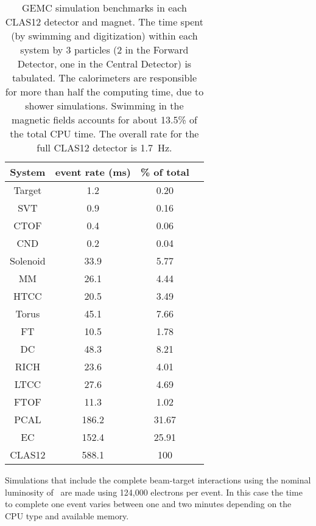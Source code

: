 \begin{table}[h]
	\begin{center}
		\begin{tabular}{ |c | c | c | c |} \hline \hline
System	 & event rate (ms)   &  \% of total\\
			\hline
Target   &  1.2   & 0.20  \\
SVT      &  0.9   & 0.16  \\
CTOF     &  0.4   & 0.06  \\
CND      &  0.2   & 0.04  \\
Solenoid &  33.9  & 5.77  \\
MM       &  26.1  & 4.44  \\
HTCC     &  20.5  & 3.49  \\
Torus    &  45.1  & 7.66  \\
FT       &  10.5  & 1.78  \\
DC       &  48.3  & 8.21  \\
RICH     &  23.6  & 4.01  \\
LTCC     &  27.6  & 4.69  \\
FTOF     &  11.3  & 1.02  \\
PCAL     &  186.2 & 31.67 \\
EC       &  152.4 & 25.91 \\ \hline
CLAS12   &  588.1 & 100 \\ \hline \hline
	\end{tabular}
	\end{center}
	\caption{GEMC simulation benchmarks in each CLAS12 detector and magnet. The time spent (by swimming and
          digitization) within each system by 3 particles (2 in the Forward Detector, one in the Central Detector) is
          tabulated. The calorimeters are responsible for more than half the computing time, due to shower simulations.
          Swimming in the magnetic fields accounts for about 13.5\% of the total CPU time. The overall rate for the full
          CLAS12 detector is 1.7~Hz.}
\label{tab:benchmarks}
\end{table}

\noindent Simulations that include the complete beam-target interactions using the nominal luminosity of \cLuminosity\
are made using 124,000 electrons per event. In this case the time to complete one event varies between one and two
minutes depending on the CPU type and available memory.

































